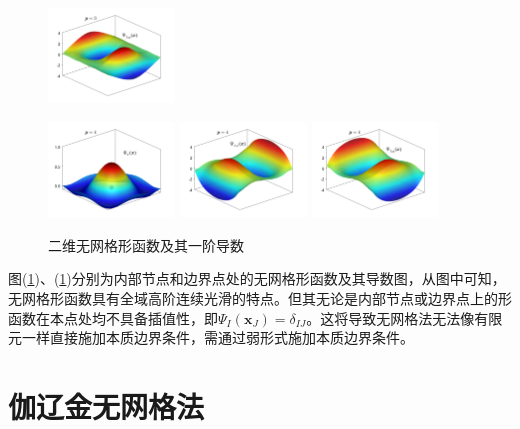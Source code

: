 \begin{figure}[H]
\begin{subcaptiongroup}
\label{dshape}
\includegraphics[width=0.3\textwidth]{figure/nomesh/C3.png}
\label{dshape}
\label{dshape}
\end{subcaptiongroup}
\begin{subcaptiongroup}
\includegraphics[width=0.3\textwidth]{figure/nomesh/Qt1.png}
\label{shape}
\includegraphics[width=0.3\textwidth]{figure/nomesh/Qt2.png}
\label{dshape}
\includegraphics[width=0.3\textwidth]{figure/nomesh/Qt3.png}
\label{dshape}
\label{dshape}
\end{subcaptiongroup}
\caption{二维无网格形函数及其一阶导数}\label{gradient}
\end{figure}
图(\ref{gradient})、(\ref{})分别为内部节点和边界点处的无网格形函数及其导数图，从图中可知，无网格形函数具有全域高阶连续光滑的特点。但其无论是内部节点或边界点上的形函数在本点处均不具备插值性，即$\Psi_I(\pmb{x}_J)=\delta_{IJ}$。这将导致无网格法无法像有限元一样直接施加本质边界条件，需通过弱形式施加本质边界条件。

\section{伽辽金无网格法}
